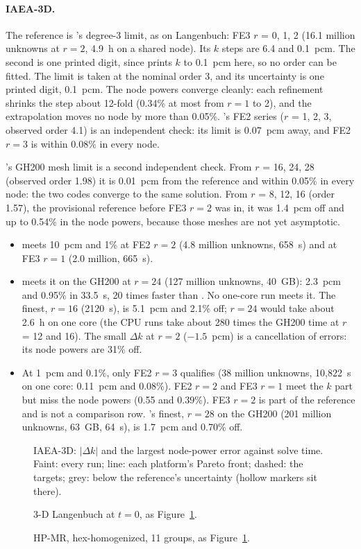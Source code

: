 \paragraph{IAEA-3D.} The reference is \ffn's degree-3 limit, as on
Langenbuch: FE3 $r$ = 0, 1, 2 (16.1 million unknowns at $r=2$, 4.9~h on a
shared node). Its $k$ steps are 6.4 and 0.1~pcm. The second is one printed
digit, since \ffn{} prints $k$ to 0.1~pcm here, so no order can be fitted.
The limit is taken at the nominal order 3, and its uncertainty is one
printed digit, 0.1~pcm. The node powers converge cleanly: each
refinement shrinks the step about 12-fold (0.34\% at most from $r=1$ to 2),
and the extrapolation moves no node by more than 0.05\%. \ffn's FE2 series
($r$ = 1, 2, 3, observed order 4.1) is an independent check: its limit is
0.07~pcm away, and FE2 $r=3$ is within 0.08\% in every node.

\garnet's GH200 mesh limit is a second independent check. From $r$ = 16,
24, 28 (observed order 1.98) it is 0.01~pcm from the reference and within
0.05\% in every node: the two codes converge to the same solution. From
$r$ = 8, 12, 16 (order 1.57), the provisional reference before FE3 $r=2$
was in, it was 1.4~pcm off and up to 0.54\% in the node powers, because
those meshes are not yet asymptotic.
\begin{itemize}
\item \ffn{} meets 10~pcm and 1\% at FE2 $r=2$ (4.8 million unknowns,
  658~s) and at FE3 $r=1$ (2.0 million, 665~s).
\item \garnet{} meets it on the GH200 at $r=24$ (127 million unknowns,
  40~GB): 2.3~pcm and 0.95\% in 33.5~s, 20 times faster than \ffn. No
  one-core run meets it. The finest, $r=16$ (2120~s), is 5.1~pcm and 2.1\%
  off; $r=24$ would take about 2.6~h on one core (the CPU runs take about
  280 times the GH200 time at $r$ = 12 and 16). The small $\Delta k$ at
  $r=2$ ($-1.5$~pcm) is a cancellation of errors: its node powers are 31\%
  off.
\item At 1~pcm and 0.1\%, only FE2 $r=3$ qualifies (38 million unknowns,
  10,822~s on one core: 0.11~pcm and 0.08\%). FE2 $r=2$ and FE3 $r=1$
  meet the $k$ part but miss the node powers (0.55 and 0.39\%). FE3 $r=2$
  is part of the reference and is not a comparison row. \garnet's finest,
  $r=28$ on the GH200 (201 million unknowns, 63~GB, 64~s), is 1.7~pcm and
  0.70\% off.
\end{itemize}

\begin{figure}[h]
\caption{IAEA-3D: $|\Delta k|$ and the largest node-power error against solve
time. Faint: every run; line: each platform's Pareto front; dashed: the
targets; grey: below the reference's uncertainty (hollow markers sit there).}
\label{fig:iaea}
\end{figure}
\begin{figure}[h]
\caption{3-D Langenbuch at $t=0$, as Figure~\ref{fig:iaea}.}
\label{fig:lmw}
\end{figure}
\begin{figure}[h]
\caption{HP-MR, hex-homogenized, 11 groups, as Figure~\ref{fig:iaea}.}
\label{fig:hpmr}
\end{figure}
